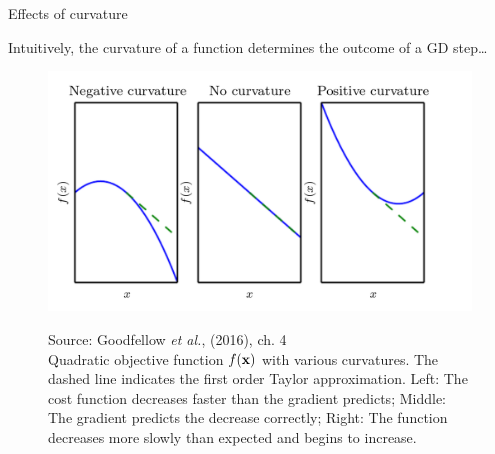 \begin{frame} {Effects of curvature}

	Intuitively, the curvature of a function determines the outcome of a GD step\dots
	
	\vspace*{-0.5cm}
	\begin{figure}
		\begin{center}
			\includegraphics[width=.7\textwidth]{figure_man/curvature.png}
		\end{center}
		\tiny{Source: Goodfellow \emph{et al.}, (2016), ch. 4} \\
		\footnotesize{Quadratic objective function $f(\mathbf{x})$ with various curvatures.
			The dashed line indicates the first order Taylor approximation. Left: The cost function decreases faster than the gradient predicts; Middle: The gradient predicts the decrease correctly; Right: The function decreases more slowly than expected and begins to increase. }
	\end{figure}
\end{frame}


	


	

